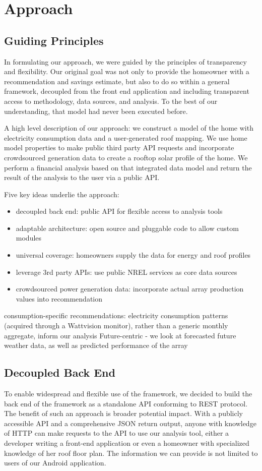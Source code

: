 \documentclass[pageno]{jpaper}
\begin{document}
\section{Approach}
\subsection{Guiding Principles}
In formulating our approach, we were guided by the principles of transparency and flexibility. Our original goal was not only to provide the homeowner with a recommendation and savings estimate, but also to do so within a general framework, decoupled from the front end application and including transparent access to methodology, data sources, and analysis. To the best of our understanding, that model had never been executed before. 

A high level description of our approach: we construct a model of the home with electricity consumption data and a user-generated roof mapping. We use home model properties to make public third party API requests and incorporate crowdsourced generation data to create a rooftop solar profile of the home. We perform a financial analysis based on that integrated data model and return the result of the analysis to the user via a public API.

Five key ideas underlie the approach:
\begin{itemize}
\item decoupled back end: public API for flexible access to analysis tools
\item adaptable architecture: open source and pluggable code to allow custom modules
\item universal coverage: homeowners supply the data for energy and roof profiles
\item leverage 3rd party APIs: use public NREL services as core data sources
\item crowdsourced power generation data: incorporate actual array production values into recommendation
\end{itemize}

consumption-specific recommendations: electricity consumption patterns (acquired through a Wattvision monitor), rather than a generic monthly aggregate, inform our analysis
Future-centric
- we look at forecasted future weather data, as well as predicted performance of the array

\subsection{Decoupled Back End}
To enable widespread and flexible use of the framework, we decided to build the back end of the framework as a standalone API conforming to REST protocol. The benefit of such an approach is broader potential impact. With a publicly accessible API and a comprehensive JSON return output, anyone with knowledge of HTTP can make requests to the API to use our analysis tool, either a developer writing a front-end application or even a homeowner with specialized knowledge of her roof floor plan. The information we can provide is not limited to users of our Android application.
\end{document}
